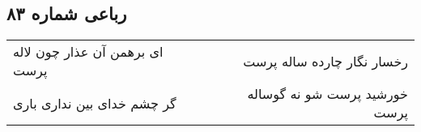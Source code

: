 \begin{center}
\section*{رباعی شماره ۸۳}
\label{sec:sh083}
\begin{longtable}{l p{0.5cm} r}
ای برهمن آن عذار چون لاله پرست
&&
رخسار نگار چارده ساله پرست
\\
گر چشم خدای بین نداری باری
&&
خورشید پرست شو نه گوساله پرست
\\
\end{longtable}
\end{center}
